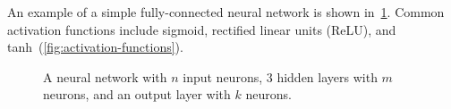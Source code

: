 \documentclass[ppgc,diss,english]{iiufrgs}
\def\nstyle{int(\lay<\Nnodlen?min(2,\lay):3)} %
\begin{document}
An example of a simple fully-connected neural network is shown in~\cref{fig:neural-network}.
Common activation functions include sigmoid, rectified linear units (ReLU), and tanh~(\cref{fig:activation-functions}).

\begin{figure}[ht]
\caption[A fully-connected neural network]{A neural network with $n$ input neurons, $3$ hidden layers with $m$ neurons, and an output layer with $k$ neurons.}
\vspace{\baselineskip}
\centering
{}
\label{fig:neural-network}
\end{figure}
\end{document}
